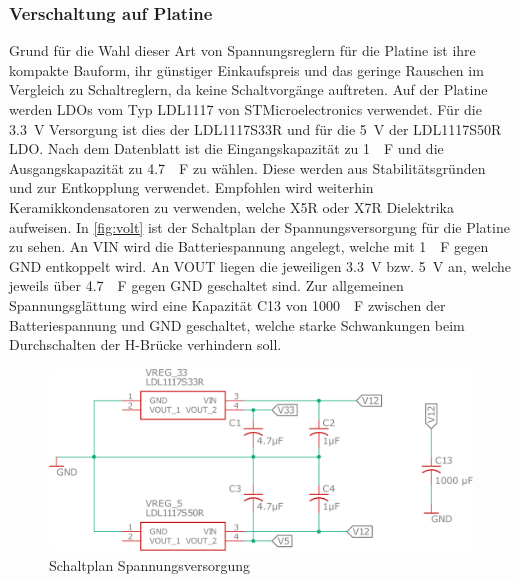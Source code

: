 \subsubsection{Verschaltung auf Platine}
Grund für die Wahl dieser Art von Spannungsreglern für die Platine ist ihre kompakte Bauform, ihr günstiger Einkaufspreis und das geringe Rauschen im Vergleich zu Schaltreglern, da keine Schaltvorgänge auftreten. Auf der Platine werden LDOs vom Typ LDL1117 von STMicroelectronics verwendet. Für die \SI{3,3}{V} Versorgung ist dies der LDL1117S33R und für die \SI{5}{V} der LDL1117S50R LDO. Nach dem Datenblatt \cite[S.7]{ldo} ist die Eingangskapazität zu \SI{1}{\mu F} und die Ausgangskapazität zu \SI{4,7}{\mu F} zu wählen. Diese werden aus Stabilitätsgründen und zur Entkopplung verwendet. Empfohlen wird weiterhin Keramikkondensatoren zu verwenden, welche X5R oder X7R Dielektrika aufweisen. In \autoref{fig:volt} ist der Schaltplan der Spannungsversorgung für die Platine zu sehen. An VIN wird die Batteriespannung angelegt, welche mit \SI{1}{\mu F} gegen GND entkoppelt wird. An VOUT liegen die jeweiligen \SI{3,3}{V} bzw. \SI{5}{V} an, welche jeweils über \SI{4,7}{\mu F} gegen GND geschaltet sind. Zur allgemeinen Spannungsglättung wird eine Kapazität C13 von \SI{1000}{\mu F} zwischen der Batteriespannung und GND geschaltet, welche starke Schwankungen beim Durchschalten der H-Brücke verhindern soll.

\begin{figure}[H]%
\centering
\includegraphics[width=410pt]{./Bilder/volt.pdf}%
\caption{Schaltplan Spannungsversorgung}%
\label{fig:volt}%
\end{figure}

